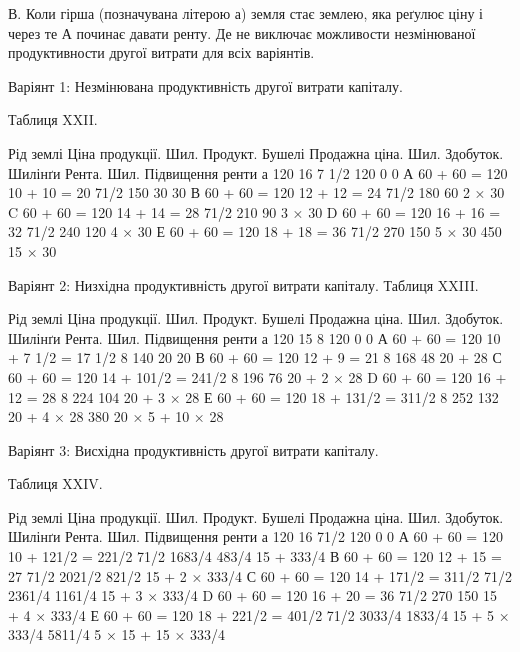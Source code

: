 В. Коли гірша (позначувана літерою а) земля стає землею, яка реґулює
ціну і через те А починає давати ренту. Де не виключає можливости незмінюваної
продуктивности другої витрати для всіх варіянтів.

Варіянт 1: Незмінювана продуктивність другої витрати капіталу.

Таблиця XXII.

Рід  землі
Ціна продукції. Шил.
Продукт. Бушелі
Продажна  ціна. Шил.
Здобуток. Шилінґи
Рента. Шил.
Підвищення ренти
а    120                                               16    7 1/2    120          0    0
А    60 + 60 = 120    10 + 10 = 20    71/2    150         30    30
В    60 + 60 = 120      12 + 12 = 24    71/2    180         60    2 × 30
C    60 + 60 = 120    14 + 14 = 28    71/2    210         90    3 × 30
D    60 + 60 = 120    16 + 16 = 32    71/2    240        120    4 × 30
Е    60 + 60 = 120    18 + 18 = 36    71/2    270        150    5 × 30
                    450    15 × 30

Варіянт 2: Низхідна продуктивність другої витрати капіталу.
  Таблиця XXIII.

Рід  землі
Ціна продукції. Шил.
Продукт. Бушелі
Продажна  ціна. Шил.
Здобуток. Шилінґи
Рента. Шил.
Підвищення ренти
а                       120                        15            8    120            0    0
А 60 + 60 = 120 10 + 7 1/2 = 17 1/2 8 140 20 20
В 60 + 60 = 120 12 + 9 = 21 8 168 48 20 + 28
С 60 + 60 = 120 14 + 101/2 = 241/2    8    196            76    20 + 2 × 28
D 60 + 60 = 120 16 + 12 = 28 8 224 104 20 + 3 × 28
Е 60 + 60 = 120 18 + 131/2 = 311/2    8    252            132    20 + 4 × 28
                    380    20 × 5 + 10 × 28

Варіянт 3: Висхідна продуктивність другої витрати капіталу.

 Таблиця XXIV.

Рід  землі
Ціна продукції. Шил.
Продукт. Бушелі
Продажна  ціна. Шил.
Здобуток. Шилінґи
Рента. Шил.
Підвищення ренти
а                       120                           16              71/2    120            0
          0
А    60 + 60 = 120    10 + 121/2 = 221/2     71/2    1683/4    483/4    15 + 333/4
В    60 + 60 = 120    12 + 15 = 27                      71/2    2021/2    821/2    15 + 2 × 333/4
С    60 + 60 = 120    14 + 171/2 = 311/2      71/2    2361/4    1161/4    15 + 3 × 333/4
D    60 + 60 = 120    16 + 20 = 36                      71/2    270            150            15 + 4
× 333/4
Е    60 + 60 = 120    18 + 221/2 = 401/2      71/2    3033/4    1833/4    15 + 5 × 333/4
                    5811/4    5 × 15 + 15 × 333/4
\parbreak{}  %
